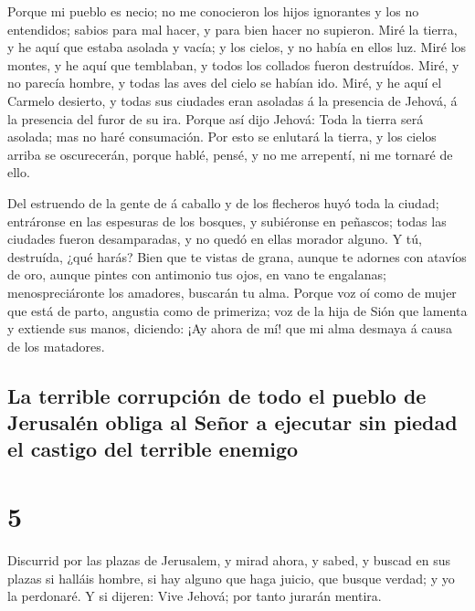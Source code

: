  Porque mi pueblo es necio; no me conocieron los hijos
ignorantes y los no entendidos; sabios para mal hacer, y para bien hacer
no supieron.  Miré la tierra, y he aquí que estaba
asolada y vacía; y los cielos, y no había en ellos luz. 
Miré los montes, y he aquí que temblaban, y todos los collados fueron
destruídos.  Miré, y no parecía hombre, y todas las aves
del cielo se habían ido.  Miré, y he aquí el Carmelo
desierto, y todas sus ciudades eran asoladas á la presencia de Jehová, á
la presencia del furor de su ira.  Porque así dijo
Jehová: Toda la tierra será asolada; mas no haré consumación.
 Por esto se enlutará la tierra, y los cielos arriba se
oscurecerán, porque hablé, pensé, y no me arrepentí, ni me tornaré de
ello.

 Del estruendo de la gente de á caballo y de los
flecheros huyó toda la ciudad; entráronse en las espesuras de los
bosques, y subiéronse en peñascos; todas las ciudades fueron
desamparadas, y no quedó en ellas morador alguno.  Y tú,
destruída, ¿qué harás? Bien que te vistas de grana, aunque te adornes
con atavíos de oro, aunque pintes con antimonio tus ojos, en vano te
engalanas; menospreciáronte los amadores, buscarán tu alma.
 Porque voz oí como de mujer que está de parto, angustia
como de primeriza; voz de la hija de Sión que lamenta y extiende sus
manos, diciendo: ¡Ay ahora de mí! que mi alma desmaya á causa de los
matadores.

\hypertarget{la-terrible-corrupciuxf3n-de-todo-el-pueblo-de-jerusaluxe9n-obliga-al-seuxf1or-a-ejecutar-sin-piedad-el-castigo-del-terrible-enemigo}{%
\subsection{La terrible corrupción de todo el pueblo de Jerusalén obliga
al Señor a ejecutar sin piedad el castigo del terrible
enemigo}\label{la-terrible-corrupciuxf3n-de-todo-el-pueblo-de-jerusaluxe9n-obliga-al-seuxf1or-a-ejecutar-sin-piedad-el-castigo-del-terrible-enemigo}}

\hypertarget{section-4}{%
\section{5}\label{section-4}}

 Discurrid por las plazas de Jerusalem, y mirad ahora, y
sabed, y buscad en sus plazas si halláis hombre, si hay alguno que haga
juicio, que busque verdad; y yo la perdonaré.  Y si
dijeren: Vive Jehová; por tanto jurarán mentira.

